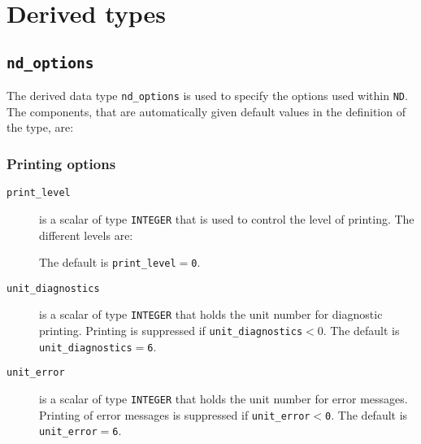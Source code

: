 



\section{Derived types}
\subsection{\texttt{nd\_options}}
\label{nd:type:options}

The derived data type {\tt nd\_options} is used to specify the options used
within \texttt{ND}. The components, that are automatically
given default values in the definition of the type, are: \\

\subsubsection*{Printing options}

\begin{description}

\item[\texttt{print\_level}] is a scalar of type  {\tt INTEGER}
that is used to control the level of printing. The different levels are:
The default is {\tt print\_level$=$\tt 0}.

\item[\texttt{unit\_diagnostics}] is a scalar  of type
{\tt INTEGER} that holds the
unit number for diagnostic printing. Printing is suppressed if
{\tt unit\_diagnostics$<0$}.
The default is {\tt unit\_diagnostics$=$6}.

\item[\texttt{unit\_error}] is a scalar of type  {\tt INTEGER} that holds the
unit number for error messages.
Printing of error messages
is suppressed if {\tt unit\_error$<$0}.
The default is {\tt unit\_error$=$6}.

\end{description}



